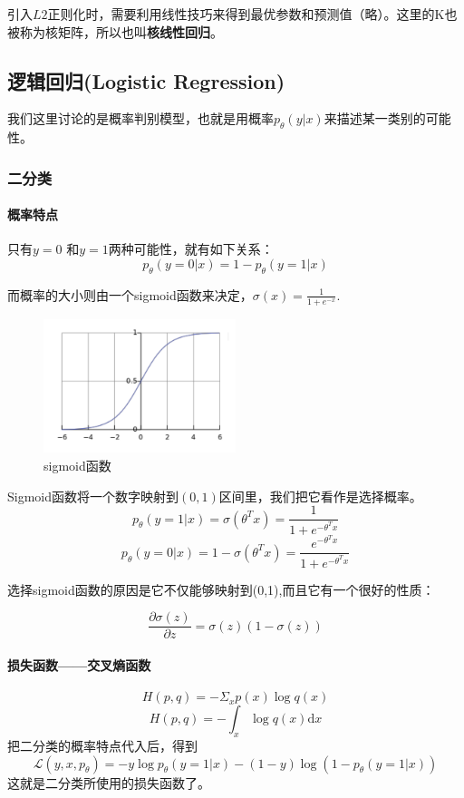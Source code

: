 引入$L2$正则化时，需要利用线性技巧来得到最优参数和预测值（略）。这里的K也被称为核矩阵，所以也叫\textbf{核线性回归}。

\subsection{逻辑回归(Logistic Regression)}
我们这里讨论的是概率判别模型，也就是用概率$p_\theta(y|x)$来描述某一类别的可能性。
\subsubsection{二分类}
\paragraph{概率特点} 只有$y=0$ 和$y=1$两种可能性，就有如下关系：
$$p_\theta(y=0|x) = 1-p_\theta(y=1|x)$$

而概率的大小则由一个sigmoid函数来决定，$\sigma(x) = \displaystyle\frac{1}{1+e^{-x}}$.
\begin{figure}[h]
  \centering
  \includegraphics[width = 0.5\textwidth]{ref/sigmoid}
  
  \label{sigmoid}
  \caption{sigmoid函数}
\end{figure}

Sigmoid函数将一个数字映射到$(0,1)$区间里，我们把它看作是选择概率。
$$p_\theta(y=1|x) = \sigma(\theta^Tx) = \displaystyle\frac{1}{1+e^{-\theta^Tx}}$$
$$p_\theta(y=0|x) = 1 - \sigma(\theta^Tx) = \displaystyle\frac{e^{-\theta^Tx}}{1+e^{-\theta^Tx}}$$

选择sigmoid函数的原因是它不仅能够映射到(0,1),而且它有一个很好的性质：

$$\displaystyle \frac{\partial\sigma(z)}{\partial z} = \sigma(z)(1-\sigma(z))$$
\paragraph{损失函数——交叉熵函数}
$$H(p,q) = -\Sigma_xp(x)\log q(x)$$
$$H(p,q) = -\int_x\log q(x)\mathrm{d}x$$  
把二分类的概率特点代入后，得到
$$\mathcal L(y,x,p_\theta) = - y\log p_\theta(y=1|x) - (1-y)\log (1-p_\theta(y=1|x))$$
这就是二分类所使用的损失函数了。

